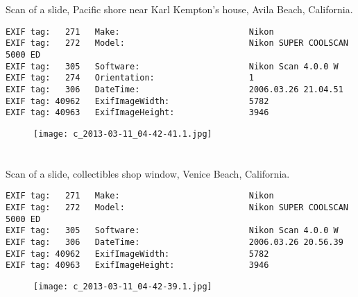 \section{\protect{}}
\noindent Scan of a slide, Pacific shore near Karl Kempton's house, Avila Beach, California.
\noindent
\begin{lstlisting}
EXIF tag:   271   Make:                          Nikon
EXIF tag:   272   Model:                         Nikon SUPER COOLSCAN 5000 ED
EXIF tag:   305   Software:                      Nikon Scan 4.0.0 W
EXIF tag:   274   Orientation:                   1
EXIF tag:   306   DateTime:                      2006.03.26 21.04.51
EXIF tag: 40962   ExifImageWidth:                5782
EXIF tag: 40963   ExifImageHeight:               3946

\end{lstlisting}
\clearpage
\begin{figure}
\raggedleft
\texttt{[image: c\_2013-03-11\_04-42-41.1.jpg]}
\end{figure}


\clearpage
\section{\protect{}}
\noindent Scan of a slide, collectibles shop window, Venice Beach, California.
\noindent
\begin{lstlisting}
EXIF tag:   271   Make:                          Nikon
EXIF tag:   272   Model:                         Nikon SUPER COOLSCAN 5000 ED
EXIF tag:   305   Software:                      Nikon Scan 4.0.0 W
EXIF tag:   306   DateTime:                      2006.03.26 20.56.39
EXIF tag: 40962   ExifImageWidth:                5782
EXIF tag: 40963   ExifImageHeight:               3946

\end{lstlisting}
\clearpage
\begin{figure}
\raggedleft
\texttt{[image: c\_2013-03-11\_04-42-39.1.jpg]}
\end{figure}


\clearpage
